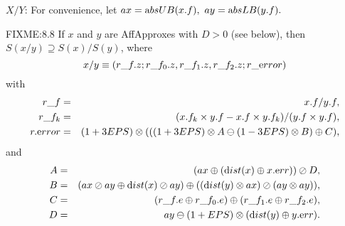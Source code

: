 $X/Y$: 
For convenience, let  $ax = {\textrm absUB}(x.f),\ ay = {\textrm absLB}(y.f).$ 
 
\begin{proposition}{FIXME:8.8} If $x$ and $y$ are 
{\textrm AffApproxes}  with $D > 0$ {\textrm (}\/see below{\textrm ),} then
$S(x / y) \supseteq S(x) / S(y)${\textrm ,} where
$$x / y \equiv (r\_f.z; r\_f_0.z, r\_f_1.z, r\_f_2.z; r\_{\textrm error})$$
with
\begin{eqnarray*}
r\_f &=& x.f / y.f,
\\
r\_f_k& =& (x.f_k \times y.f - x.f \times y.f_k)/ (y.f \times y.f),\\
r.{\textrm error} & =& (1 + 3EPS) \otimes (
((1 + 3EPS) \otimes A \ominus (1 - 3EPS) \otimes B )\oplus C ),\end{eqnarray*}
and
\begin{eqnarray*}
A &=& (ax \oplus ({\textrm dist}(x) \oplus x.{\textrm err})) \oslash D,\\
B &=& (ax \oslash ay \oplus {\textrm dist}(x) \oslash ay)
\oplus  (({\textrm dist}(y) \otimes ax) \oslash (ay \otimes ay)),\\
C &=& (r\_f.e \oplus r\_f_0.e) \oplus (r\_f_1.e \oplus
r\_f_2.e),\\
D &=& ay \ominus (1 + EPS) \otimes ({\textrm dist}(y) \oplus y.{\textrm err}).
\end{eqnarray*}
\end{proposition}

